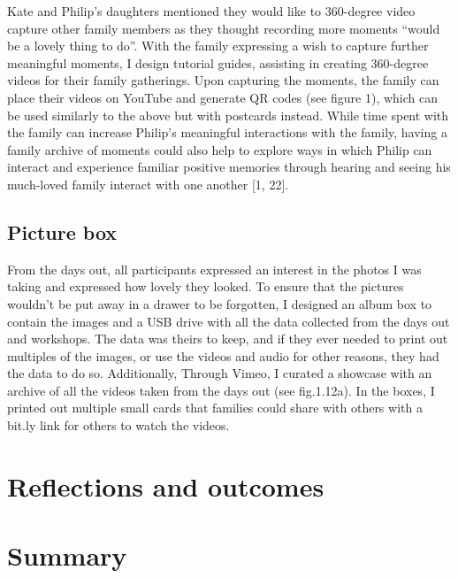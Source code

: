Kate and Philip's daughters mentioned they would like to 360-degree video capture other family members as they thought recording more moments ``would be a lovely thing to do''. With the family expressing a wish to capture further meaningful moments, I design tutorial guides, assisting in creating 360-degree videos for their family gatherings. Upon capturing the moments, the family can place their videos on YouTube and generate QR codes (see figure 1), which can be used similarly to the above but with postcards instead. While time spent with the family can increase Philip’s meaningful interactions with the family, having a family archive of moments could also help to explore ways in which Philip can interact and experience familiar positive memories through hearing and seeing his much-loved family interact with one another [1, 22].

\subsection{Picture box}
\label{PictureBox}
From the days out, all participants expressed an interest in the photos I was taking and expressed how lovely they looked. To ensure that the pictures wouldn't be put away in a drawer to be forgotten, I designed an album box to contain the images and a USB drive with all the data collected from the days out and workshops. The data was theirs to keep, and if they ever needed to print out multiples of the images, or use the videos and audio for other reasons, they had the data to do so. Additionally, Through Vimeo, I curated a showcase with an archive of all the videos taken from the days out (see fig.1.12a). In the boxes, I printed out multiple small cards that families could share with others with a bit.ly link for others to watch the videos. 

\section{Reflections and outcomes}
\label{S2:Reflection}

\section{Summary}
\label{C4:Summary}





